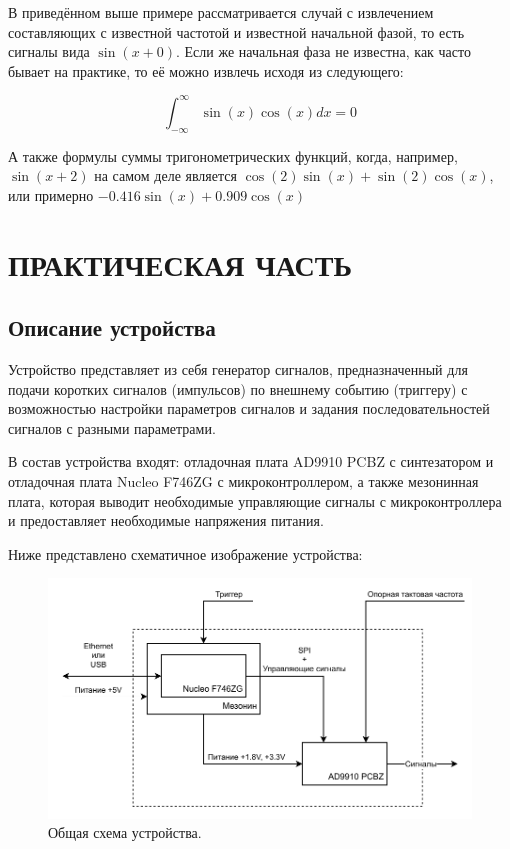 \documentclass[rusmathsym, eqnumwithinsec, amspack, hyperref]{bomgost}
\begin{document}
В приведённом выше примере рассматривается случай с извлечением составляющих с известной частотой и известной начальной фазой, то есть сигналы вида $\sin(x+0)$. Если же начальная фаза не известна, как часто бывает на практике, то её можно извлечь исходя из следующего:

\begin{equation}
	\int_{-\infty}^{\infty}{\sin(x)\cos(x)}{dx}=0
\end{equation}

А также формулы суммы тригонометрических функций, когда, например, $\sin(x+2)$ на самом деле является $\cos(2)\sin(x) + \sin(2)\cos(x)$, или примерно $-0.416\sin(x) + 0.909\cos(x)$

%
%
\section{ПРАКТИЧЕСКАЯ ЧАСТЬ}
\subsection{Описание устройства}

Устройство представляет из себя генератор сигналов, предназначенный для подачи коротких сигналов (импульсов) по внешнему событию (триггеру) с возможностью настройки параметров сигналов и задания последовательностей сигналов с разными параметрами.

В состав устройства входят: отладочная плата AD9910 PCBZ с синтезатором и отладочная плата Nucleo F746ZG с микроконтроллером, а также мезонинная плата, которая выводит необходимые управляющие сигналы с микроконтроллера и предоставляет необходимые напряжения питания.

Ниже представлено схематичное изображение устройства:

%
%
\begin{gostfigure}
\begin{figure}[H]
\centering
\includegraphics{data/system_architecture.drawio.pdf}
\caption{Общая схема устройства.}
\label{fig:system_architecture}
\end{figure}
\end{gostfigure}
\end{document}
